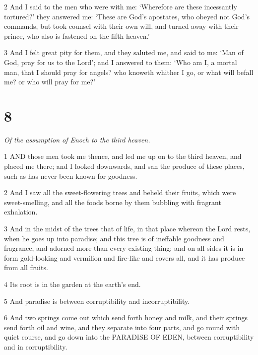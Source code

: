 \par 2 And I said to the men who were with me: ‘Wherefore are these incessantly tortured?’ they answered me: ‘These are God's apostates, who obeyed not God's commands, but took counsel with their own will, and turned away with their prince, who also is fastened on the fifth heaven.’

\par 3 And I felt great pity for them, and they saluted me, and said to me: ‘Man of God, pray for us to the Lord’; and I answered to them: ‘Who am I, a mortal man, that I should pray for angels? who knoweth whither I go, or what will befall me? or who will pray for me?’

\chapter{8}

\par \textit{Of the assumption of Enoch to the third heaven.}

\par 1 AND those men took me thence, and led me up on to the third heaven, and placed me there; and I looked downwards, and san the produce of these places, such as has never been known for goodness.

\par 2 And I saw all the sweet-flowering trees and beheld their fruits, which were sweet-smelling, and all the foods borne by them bubbling with fragrant exhalation.

\par 3 And in the midst of the trees that of life, in that place whereon the Lord rests, when he goes up into paradise; and this tree is of ineffable goodness and fragrance, and adorned more than every existing thing; and on all sides it is in form gold-looking and vermilion and fire-like and covers all, and it has produce from all fruits.

\par 4 Its root is in the garden at the earth's end.

\par 5 And paradise is between corruptibility and incorruptibility.

\par 6 And two springs come out which send forth honey and milk, and their springs send forth oil and wine, and they separate into four parts, and go round with quiet course, and go down into the PARADISE OF EDEN, between corruptibility and in corruptibility.

